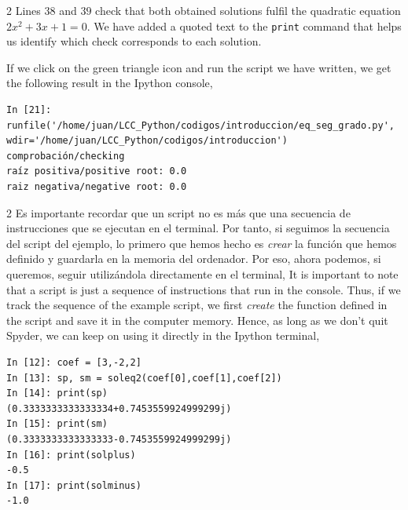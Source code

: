 \begin{paracol}{2}
     Lines $38$ and $39$ check that both obtained solutions fulfil the quadratic equation $2x^2+3x+1 = 0$. We have added a quoted text to the \texttt{print} command that helps us identify which check corresponds to each solution.

     If we click on the green triangle icon and run the script we have written, we get the following result in the Ipython console,
     
\end{paracol}

\begin{verbatim}
In [21]: runfile('/home/juan/LCC_Python/codigos/introduccion/eq_seg_grado.py',
wdir='/home/juan/LCC_Python/codigos/introduccion')
comprobación/checking
raíz positiva/positive root: 0.0
raiz negativa/negative root: 0.0  
\end{verbatim}

\begin{paracol}{2}
Es importante recordar que un script no es más que una secuencia de instrucciones que se ejecutan en el terminal. Por tanto, si seguimos la secuencia del script del ejemplo, lo primero que hemos hecho es \emph{crear} la función que hemos definido y guardarla en la memoria del ordenador. Por eso, ahora podemos, si queremos, seguir utilizándola directamente en el terminal,
\switchcolumn
It is important to note that a script is just a sequence of instructions that run in the console. Thus, if we track the sequence of the example script, we first \emph{create} the function defined in the script and save it in the computer memory. Hence, as long as we don't quit Spyder,  we can keep on using it directly in the Ipython terminal,  
\end{paracol}

\begin{verbatim}
In [12]: coef = [3,-2,2]
In [13]: sp, sm = soleq2(coef[0],coef[1],coef[2])
In [14]: print(sp)
(0.3333333333333334+0.7453559924999299j)
In [15]: print(sm)
(0.3333333333333333-0.7453559924999299j)
In [16]: print(solplus)
-0.5
In [17]: print(solminus)
-1.0   
\end{verbatim}

